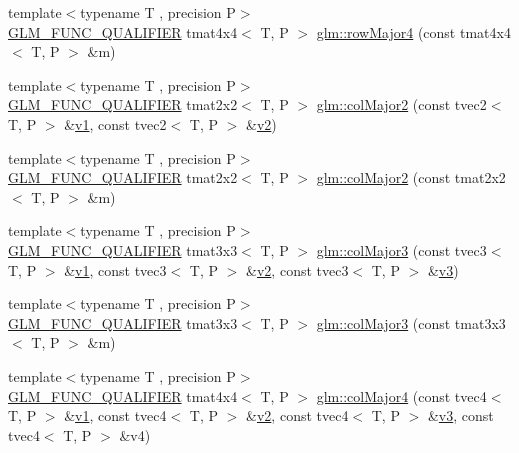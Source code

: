 \begin{DoxyCompactItemize}
\item 
{\footnotesize template$<$typename T , precision P$>$ }\\\mbox{\hyperlink{setup_8hpp_a33fdea6f91c5f834105f7415e2a64407}{G\+L\+M\+\_\+\+F\+U\+N\+C\+\_\+\+Q\+U\+A\+L\+I\+F\+I\+ER}} tmat4x4$<$ T, P $>$ \mbox{\hyperlink{group__gtx__matrix__major__storage_ga85771a88c114a088a0414bcfce55e729}{glm\+::row\+Major4}} (const tmat4x4$<$ T, P $>$ \&m)
\item 
{\footnotesize template$<$typename T , precision P$>$ }\\\mbox{\hyperlink{setup_8hpp_a33fdea6f91c5f834105f7415e2a64407}{G\+L\+M\+\_\+\+F\+U\+N\+C\+\_\+\+Q\+U\+A\+L\+I\+F\+I\+ER}} tmat2x2$<$ T, P $>$ \mbox{\hyperlink{group__gtx__matrix__major__storage_ga599fff4f1c65912b256a82138ebcca37}{glm\+::col\+Major2}} (const tvec2$<$ T, P $>$ \&\mbox{\hyperlink{glad_8h_a0779c3b73f9aa3a0ac5b0139b5d291d9}{v1}}, const tvec2$<$ T, P $>$ \&\mbox{\hyperlink{glad_8h_a9a09a1837922b2b806f4589096a52049}{v2}})
\item 
{\footnotesize template$<$typename T , precision P$>$ }\\\mbox{\hyperlink{setup_8hpp_a33fdea6f91c5f834105f7415e2a64407}{G\+L\+M\+\_\+\+F\+U\+N\+C\+\_\+\+Q\+U\+A\+L\+I\+F\+I\+ER}} tmat2x2$<$ T, P $>$ \mbox{\hyperlink{group__gtx__matrix__major__storage_ga5cfd25de9d5b4c6a825085f38ddfeff7}{glm\+::col\+Major2}} (const tmat2x2$<$ T, P $>$ \&m)
\item 
{\footnotesize template$<$typename T , precision P$>$ }\\\mbox{\hyperlink{setup_8hpp_a33fdea6f91c5f834105f7415e2a64407}{G\+L\+M\+\_\+\+F\+U\+N\+C\+\_\+\+Q\+U\+A\+L\+I\+F\+I\+ER}} tmat3x3$<$ T, P $>$ \mbox{\hyperlink{group__gtx__matrix__major__storage_ga3a55e2948193e91733e434e7cc3c1540}{glm\+::col\+Major3}} (const tvec3$<$ T, P $>$ \&\mbox{\hyperlink{glad_8h_a0779c3b73f9aa3a0ac5b0139b5d291d9}{v1}}, const tvec3$<$ T, P $>$ \&\mbox{\hyperlink{glad_8h_a9a09a1837922b2b806f4589096a52049}{v2}}, const tvec3$<$ T, P $>$ \&\mbox{\hyperlink{glad_8h_acc806b31cbf466ceba6555983d8b814d}{v3}})
\item 
{\footnotesize template$<$typename T , precision P$>$ }\\\mbox{\hyperlink{setup_8hpp_a33fdea6f91c5f834105f7415e2a64407}{G\+L\+M\+\_\+\+F\+U\+N\+C\+\_\+\+Q\+U\+A\+L\+I\+F\+I\+ER}} tmat3x3$<$ T, P $>$ \mbox{\hyperlink{group__gtx__matrix__major__storage_gaa93f3dcc47ced18e5db4a853363d9386}{glm\+::col\+Major3}} (const tmat3x3$<$ T, P $>$ \&m)
\item 
{\footnotesize template$<$typename T , precision P$>$ }\\\mbox{\hyperlink{setup_8hpp_a33fdea6f91c5f834105f7415e2a64407}{G\+L\+M\+\_\+\+F\+U\+N\+C\+\_\+\+Q\+U\+A\+L\+I\+F\+I\+ER}} tmat4x4$<$ T, P $>$ \mbox{\hyperlink{group__gtx__matrix__major__storage_ga2829de096bb67ab5cd670958f3d402b6}{glm\+::col\+Major4}} (const tvec4$<$ T, P $>$ \&\mbox{\hyperlink{glad_8h_a0779c3b73f9aa3a0ac5b0139b5d291d9}{v1}}, const tvec4$<$ T, P $>$ \&\mbox{\hyperlink{glad_8h_a9a09a1837922b2b806f4589096a52049}{v2}}, const tvec4$<$ T, P $>$ \&\mbox{\hyperlink{glad_8h_acc806b31cbf466ceba6555983d8b814d}{v3}}, const tvec4$<$ T, P $>$ \&v4)

\end{DoxyCompactItemize}
